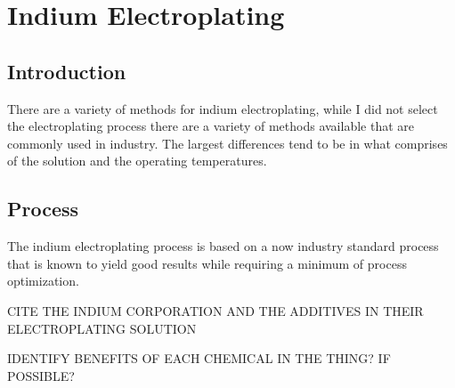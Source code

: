 \section{Indium Electroplating}

\subsection{Introduction}
There are a variety of methods for indium electroplating, while I did not select the electroplating process there are a variety of methods available that are commonly used in industry. The largest differences tend to be in what comprises of the solution and the operating temperatures.

\subsection{Process}
The indium electroplating process is based on a now industry standard process that is known to yield good results while requiring a minimum of process optimization.

CITE THE INDIUM CORPORATION AND THE ADDITIVES IN THEIR ELECTROPLATING SOLUTION

IDENTIFY BENEFITS OF EACH CHEMICAL IN THE THING? IF POSSIBLE?


